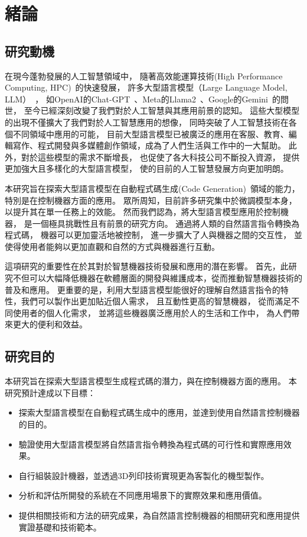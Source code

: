 \documentclass[class=NCU_thesis, crop=false]{standalone}
\begin{document}
\chapter{緒論}
\section{研究動機}

在現今蓬勃發展的人工智慧領域中，
隨著高效能運算技術(High Performance Computing, HPC)~\cite{reed2022reinventing}的快速發展，
許多大型語言模型（Large Language Model, LLM）~\cite{zhao2023survey}，
如OpenAI的Chat-GPT~\cite{Liu_2023}、Meta的Llama2~\cite{touvron2023llama}、Google的Gemini~\cite{geminiteam2024gemini}的問世，
至今已經深刻改變了我們對於人工智慧與其應用前景的認知。
這些大型模型的出現不僅擴大了我們對於人工智慧應用的想像，
同時突破了人工智慧技術在各個不同領域中應用的可能，
目前大型語言模型已被廣泛的應用在客服、教育、編輯寫作、程式開發與多媒體創作領域，成為了人們生活與工作中的一大幫助。
此外，對於這些模型的需求不斷增長，
也促使了各大科技公司不斷投入資源，
提供更加強大且多樣化的大型語言模型，
使的目前的人工智慧發展方向更加明朗。

本研究旨在探索大型語言模型在自動程式碼生成(Code Generation)~\cite{10196869}領域的能力，
特別是在控制機器方面的應用。
眾所周知，目前許多研究集中於微調模型本身，
以提升其在單一任務上的效能。
然而我們認為，將大型語言模型應用於控制機器，
是一個極具挑戰性且有前景的研究方向。
通過將人類的自然語言指令轉換為程式碼，
機器可以更加靈活地被控制，
進一步擴大了人與機器之間的交互性，
並使得使用者能夠以更加直觀和自然的方式與機器進行互動。

這項研究的重要性在於其對於智慧機器技術發展和應用的潛在影響。
首先，此研究不但可以大幅降低機器在軟體層面的開發與維護成本，從而推動智慧機器技術的普及和應用。
更重要的是，利用大型語言模型能很好的理解自然語言指令的特性，我們可以製作出更加貼近個人需求，
且互動性更高的智慧機器，
從而滿足不同使用者的個人化需求，
並將這些機器廣泛應用於人的生活和工作中，
為人們帶來更大的便利和效益。

\section{研究目的}

本研究旨在探索大型語言模型生成程式碼的潛力，與在控制機器方面的應用。
本研究預計達成以下目標：
\begin{itemize}

    \item 探索大型語言模型在自動程式碼生成中的應用，並達到使用自然語言控制機器的目的。

    \item 驗證使用大型語言模型將自然語言指令轉換為程式碼的可行性和實際應用效果。

    \item 自行組裝設計機器，並透過3D列印技術實現更為客製化的機型製作。

    \item 分析和評估所開發的系統在不同應用場景下的實際效果和應用價值。

    \item 提供相關技術和方法的研究成果，為自然語言控制機器的相關研究和應用提供實證基礎和技術範本。
\end{itemize}
\end{document}
